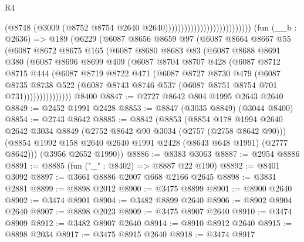 \begin{lexlean}{R4}
\begin{coremodule}
                                                    (@8748
                                                      (@3009
                                                        (@8752
                                                          @8754
                                                          @2640
                                                          @2640)))))))))))))))))))))))))))
    (fun (__b : @2636) =>
    @189
      (@6229
        (@6087
          @8656
          @8659
          @97
          (@6087
            @8664
            @8667
            @55
            (@6087
              @8672
              @8675
              @165
              (@6087
                @8680
                @8683
                @83
                (@6087
                  @8688
                  @8691
                  @380
                  (@6087
                    @8696
                    @8699
                    @409
                    (@6087
                      @8704
                      @8707
                      @428
                      (@6087
                        @8712
                        @8715
                        @444
                        (@6087
                          @8719
                          @8722
                          @471
                          (@6087
                            @8727
                            @8730
                            @479
                            (@6087
                              @8735
                              @8738
                              @522
                              (@6087 @8743 @8746 @537 (@6087 @8751 @8754 @701 @731)))))))))))))))
    @8400
@8847 := @2727 @8642 @804 @1995 @2643 @2640
@8849 := @2452 @1991 @2428
@8853 := @8847 (@3035 @8849) (@3044 @8400)
@8854 := @2743 @8642
@8885 := @8842
    (@8853
      (@8854
        @178
        @1994
        @2640
        @2642
        @3034
        @8849
        (@2752 @8642 @90 @3034 (@2757 (@2758 @8642 @90)))
        (@8854 @1992 @158 @2640 @2640 @1991 @2428 (@8643 @648 @1991) (@2777 @8642)))
      (@3956 @2652 @1990))
@8886 := @8383 @3063
@8887 := @2954 @8886
@8891 := @8885 (fun ("_" : @8402) => @8887 @22 @190)
@8892 := @8401 @3092
@8897 := @3661 @8886 @2007 @668 @2166 @2645
@8898 := @3831 @2881
@8899 := @8898 @2012
@8900 := @3475 @8899
@8901 := @8900 @2640
@8902 := @3474 @8901
@8904 := @3482 @8899 @2640
@8906 := @8902 @8904 @2640
@8907 := @8898 @2023
@8909 := @3475 @8907 @2640
@8910 := @3474 @8909
@8912 := @3482 @8907 @2640
@8914 := @8910 @8912 @2640
@8915 := @8898 @2034
@8917 := @3475 @8915 @2640
@8918 := @3474 @8917

\end{coremodule}
\end{lexlean}

